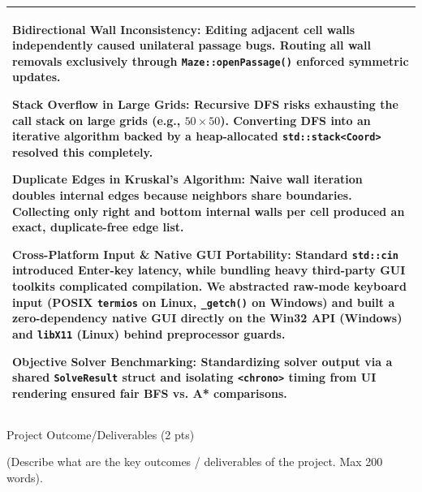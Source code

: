 \documentclass[12pt,a4paper]{article}
\newcommand{\secthead}[2]{%
  {\fontsize{18}{21.9}\selectfont\color{geheading}#1\par}\vspace{1.6pt}%
  {\fontsize{10.5}{14.5}\selectfont\color{gehint}#2\par}%
  \vspace{\secgap}}
\newlength{\secgap}\setlength{\secgap}{5.7pt}
\newenvironment{answerbox}{%
  \noindent\begin{tabular}{|p{\dimexpr\textwidth-2\tabcolsep-2\arrayrulewidth\relax}|}\hline
  \fontsize{10.8}{13.3}\selectfont\setlength{\parskip}{3.5pt}\rule{0pt}{18pt}\ignorespaces}{%
  \rule[-11pt]{0pt}{0pt}\\\hline\end{tabular}\par}
\begin{document}
\begin{answerbox}
\textbf{Bidirectional Wall Inconsistency:} Editing adjacent cell walls independently caused unilateral passage bugs. Routing all wall removals exclusively through \texttt{Maze::openPassage()} enforced symmetric updates.\par\vspace{2pt}
\textbf{Stack Overflow in Large Grids:} Recursive DFS risks exhausting the call stack on large grids (e.g., $50 \times 50$). Converting DFS into an iterative algorithm backed by a heap-allocated \texttt{std::stack<Coord>} resolved this completely.\par\vspace{2pt}
\textbf{Duplicate Edges in Kruskal's Algorithm:} Naive wall iteration doubles internal edges because neighbors share boundaries. Collecting only right and bottom internal walls per cell produced an exact, duplicate-free edge list.\par\vspace{2pt}
\textbf{Cross-Platform Input \& Native GUI Portability:} Standard \texttt{std::cin} introduced Enter-key latency, while bundling heavy third-party GUI toolkits complicated compilation. We abstracted raw-mode keyboard input (POSIX \texttt{termios} on Linux, \texttt{\_getch()} on Windows) and built a zero-dependency native GUI directly on the Win32 API (Windows) and \texttt{libX11} (Linux) behind preprocessor guards.\par\vspace{2pt}
\textbf{Objective Solver Benchmarking:} Standardizing solver output via a shared \texttt{SolveResult} struct and isolating \texttt{<chrono>} timing from UI rendering ensured fair BFS vs. A* comparisons.
\end{answerbox}

\newpage


\vspace*{-0.15cm}

\secthead{Project Outcome/Deliverables (2 pts)}{(Describe what are the key outcomes / deliverables of the project. Max 200 words).}
\end{document}
